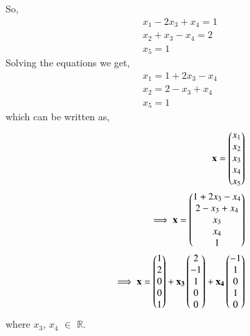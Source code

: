 \documentclass[journal,12pt,twocolumn]{IEEEtran}
\begin{document}
So,
\begin{align}
x_1-2x_3+x_4=1\\
x_2+x_3-x_4=2\\
x_5=1
\end{align}
Solving the equations we get,
\begin{align}
x_1=1+2x_3-x_4\\
x_2=2-x_3+x_4\\
x_5=1
\end{align}
which can be written as,
   \begin{align}
   \mathbf{x} = \begin{pmatrix}x_1\\x_2\\x_3 \\ x_4 \\ x_5\end{pmatrix}\\
   \implies \mathbf{x}=\begin{pmatrix}1+2x_3-x_4\\2-x_3+x_4\\x_3\\x_4\\1\end{pmatrix}\\
   \implies \mathbf{x}=\begin{pmatrix}1\\2\\0\\0\\1\end{pmatrix}+\mathbf{x_3}\begin{pmatrix}2\\-1\\1\\0\\0\end{pmatrix}+\mathbf{x_4}\begin{pmatrix}-1\\1\\0\\1\\0\end{pmatrix}
\end{align}
where $x_3$, $x_4$ $\in$ $\mathbb{R}$.
\end{document}
